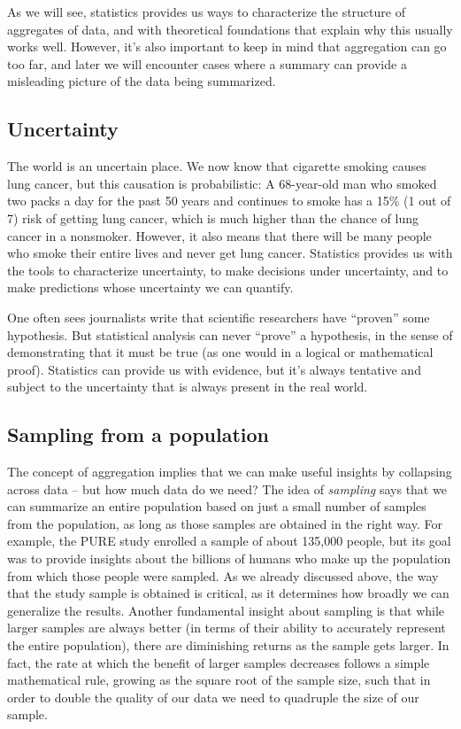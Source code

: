 \documentclass[12pt,]{book}
\theoremstyle{definition}
\theoremstyle{definition}
\theoremstyle{definition}
\theoremstyle{remark}
\begin{document}
As we will see, statistics provides us ways to characterize the structure of aggregates of data, and with theoretical foundations that explain why this usually works well. However, it's also important to keep in mind that aggregation can go too far, and later we will encounter cases where a summary can provide a misleading picture of the data being summarized.

\hypertarget{uncertainty}{%
\subsection{Uncertainty}\label{uncertainty}}

The world is an uncertain place. We now know that cigarette smoking causes lung cancer, but this causation is probabilistic: A 68-year-old man who smoked two packs a day for the past 50 years and continues to smoke has a 15\% (1 out of 7) risk of getting lung cancer, which is much higher than the chance of lung cancer in a nonsmoker. However, it also means that there will be many people who smoke their entire lives and never get lung cancer. Statistics provides us with the tools to characterize uncertainty, to make decisions under uncertainty, and to make predictions whose uncertainty we can quantify.

One often sees journalists write that scientific researchers have ``proven'' some hypothesis. But statistical analysis can never ``prove'' a hypothesis, in the sense of demonstrating that it must be true (as one would in a logical or mathematical proof). Statistics can provide us with evidence, but it's always tentative and subject to the uncertainty that is always present in the real world.

\hypertarget{sampling-from-a-population}{%
\subsection{Sampling from a population}\label{sampling-from-a-population}}

The concept of aggregation implies that we can make useful insights by collapsing across data -- but how much data do we need? The idea of \emph{sampling} says that we can summarize an entire population based on just a small number of samples from the population, as long as those samples are obtained in the right way. For example, the PURE study enrolled a sample of about 135,000 people, but its goal was to provide insights about the billions of humans who make up the population from which those people were sampled. As we already discussed above, the way that the study sample is obtained is critical, as it determines how broadly we can generalize the results. Another fundamental insight about sampling is that while larger samples are always better (in terms of their ability to accurately represent the entire population), there are diminishing returns as the sample gets larger. In fact, the rate at which the benefit of larger samples decreases follows a simple mathematical rule, growing as the square root of the sample size, such that in order to double the quality of our data we need to quadruple the size of our sample.
\end{document}
